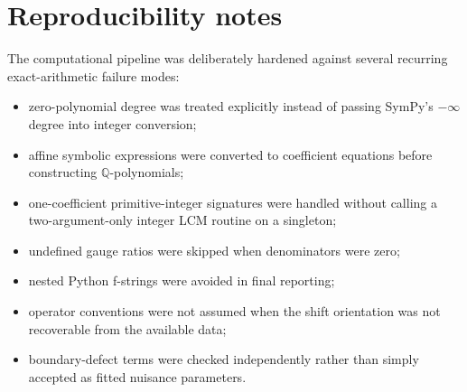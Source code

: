 \documentclass[11pt,a4paper]{article}
\newcommand{\Q}{\mathbb{Q}}
\begin{document}
\section{Reproducibility notes}

The computational pipeline was deliberately hardened against several recurring exact-arithmetic failure modes:
\begin{itemize}
  \item zero-polynomial degree was treated explicitly instead of passing SymPy's $-\infty$ degree into integer conversion;
  \item affine symbolic expressions were converted to coefficient equations before constructing $\Q$-polynomials;
  \item one-coefficient primitive-integer signatures were handled without calling a two-argument-only integer LCM routine on a singleton;
  \item undefined gauge ratios were skipped when denominators were zero;
  \item nested Python f-strings were avoided in final reporting;
  \item operator conventions were not assumed when the shift orientation was not recoverable from the available data;
  \item boundary-defect terms were checked independently rather than simply accepted as fitted nuisance parameters.
\end{itemize}
\end{document}
